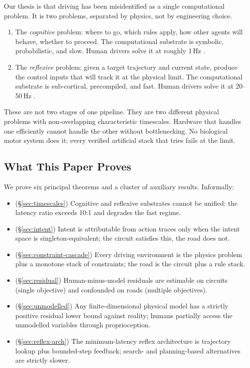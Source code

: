 \documentclass[11pt,twocolumn]{article}
\theoremstyle{definition}
\theoremstyle{remark}
\begin{document}
Our thesis is that driving has been misidentified as a single computational problem. It is two problems, separated by physics, not by engineering choice.

\begin{enumerate}[leftmargin=*,itemsep=2pt]
\item The \emph{cognitive} problem: where to go, which rules apply, how other agents will behave, whether to proceed. The computational substrate is symbolic, probabilistic, and slow. Human drivers solve it at roughly 1\,Hz \cite{kahneman2011thinking,card1983psychology}.
\item The \emph{reflexive} problem: given a target trajectory and current state, produce the control inputs that will track it at the physical limit. The computational substrate is sub-cortical, precompiled, and fast. Human drivers solve it at 20--50\,Hz \cite{schmidt2019motor,shadmehr2005biology,enoka2015neuromechanics}.
\end{enumerate}

These are not two stages of one pipeline. They are two different physical problems with non-overlapping characteristic timescales. Hardware that handles one efficiently cannot handle the other without bottlenecking. No biological motor system does it; every verified artificial stack that tries fails at the limit.

\subsection{What This Paper Proves}

We prove six principal theorems and a cluster of auxiliary results. Informally:

\begin{itemize}[leftmargin=*,itemsep=2pt]
\item (\S\ref{sec:timescales}) Cognitive and reflexive substrates cannot be unified: the latency ratio exceeds 10:1 and degrades the fast regime.
\item (\S\ref{sec:intent}) Intent is attributable from action traces only when the intent space is singleton-equivalent; the circuit satisfies this, the road does not.
\item (\S\ref{sec:constraint-cascade}) Every driving environment is the physics problem plus a monotone stack of constraints; the road is the circuit plus a rule stack.
\item (\S\ref{sec:residual}) Human-minus-model residuals are estimable on circuits (single objective) and confounded on roads (multiple objectives).
\item (\S\ref{sec:unmodelled}) Any finite-dimensional physical model has a strictly positive residual lower bound against reality; humans partially access the unmodelled variables through proprioception.
\item (\S\ref{sec:reflex-arch}) The minimum-latency reflex architecture is trajectory lookup plus bounded-step feedback; search- and planning-based alternatives are strictly slower.
\end{itemize}
\end{document}
